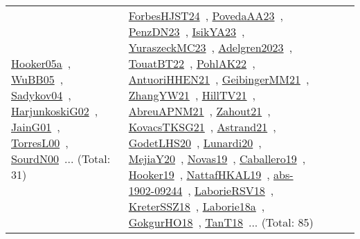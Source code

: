 {\begin{longtable}{lp{3cm}>{\raggedright\arraybackslash}p{6cm}>{\raggedright\arraybackslash}p{6cm}>{\raggedright\arraybackslash}p{8cm}}
\href{works/Hooker05a.pdf}{Hooker05a}~\cite{Hooker05a}, \href{works/WuBB05.pdf}{WuBB05}~\cite{WuBB05}, \href{works/Sadykov04.pdf}{Sadykov04}~\cite{Sadykov04}, \href{works/HarjunkoskiG02.pdf}{HarjunkoskiG02}~\cite{HarjunkoskiG02}, \href{works/JainG01.pdf}{JainG01}~\cite{JainG01}, \href{works/TorresL00.pdf}{TorresL00}~\cite{TorresL00}, \href{works/SourdN00.pdf}{SourdN00}~\cite{SourdN00}... (Total: 31) & \href{works/ForbesHJST24.pdf}{ForbesHJST24}~\cite{ForbesHJST24}, \href{works/PovedaAA23.pdf}{PovedaAA23}~\cite{PovedaAA23}, \href{works/PenzDN23.pdf}{PenzDN23}~\cite{PenzDN23}, \href{works/IsikYA23.pdf}{IsikYA23}~\cite{IsikYA23}, \href{works/YuraszeckMC23.pdf}{YuraszeckMC23}~\cite{YuraszeckMC23}, \href{works/Adelgren2023.pdf}{Adelgren2023}~\cite{Adelgren2023}, \href{works/TouatBT22.pdf}{TouatBT22}~\cite{TouatBT22}, \href{works/PohlAK22.pdf}{PohlAK22}~\cite{PohlAK22}, \href{works/AntuoriHHEN21.pdf}{AntuoriHHEN21}~\cite{AntuoriHHEN21}, \href{works/GeibingerMM21.pdf}{GeibingerMM21}~\cite{GeibingerMM21}, \href{works/ZhangYW21.pdf}{ZhangYW21}~\cite{ZhangYW21}, \href{works/HillTV21.pdf}{HillTV21}~\cite{HillTV21}, \href{works/AbreuAPNM21.pdf}{AbreuAPNM21}~\cite{AbreuAPNM21}, \href{works/Zahout21.pdf}{Zahout21}~\cite{Zahout21}, \href{works/KovacsTKSG21.pdf}{KovacsTKSG21}~\cite{KovacsTKSG21}, \href{works/Astrand21.pdf}{Astrand21}~\cite{Astrand21}, \href{works/GodetLHS20.pdf}{GodetLHS20}~\cite{GodetLHS20}, \href{works/Lunardi20.pdf}{Lunardi20}~\cite{Lunardi20}, \href{works/MejiaY20.pdf}{MejiaY20}~\cite{MejiaY20}, \href{works/Novas19.pdf}{Novas19}~\cite{Novas19}, \href{works/Caballero19.pdf}{Caballero19}~\cite{Caballero19}, \href{works/Hooker19.pdf}{Hooker19}~\cite{Hooker19}, \href{works/NattafHKAL19.pdf}{NattafHKAL19}~\cite{NattafHKAL19}, \href{works/abs-1902-09244.pdf}{abs-1902-09244}~\cite{abs-1902-09244}, \href{works/LaborieRSV18.pdf}{LaborieRSV18}~\cite{LaborieRSV18}, \href{works/KreterSSZ18.pdf}{KreterSSZ18}~\cite{KreterSSZ18}, \href{works/Laborie18a.pdf}{Laborie18a}~\cite{Laborie18a}, \href{works/GokgurHO18.pdf}{GokgurHO18}~\cite{GokgurHO18}, \href{works/TanT18.pdf}{TanT18}~\cite{TanT18}... (Total: 85)\\

\end{longtable}}
